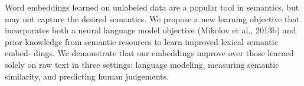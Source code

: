 Word embeddings learned on unlabeled data are a popular tool in semantics, but may not capture the desired semantics. We propose a new learning objective that incorporates both a neural language model objective (Mikolov et al., 2013b) and prior knowledge from semantic resources to learn improved lexical semantic embed- dings. We demonstrate that our embeddings improve over those learned solely on raw text in three settings: language modeling, measuring semantic similarity, and predicting human judgements.
